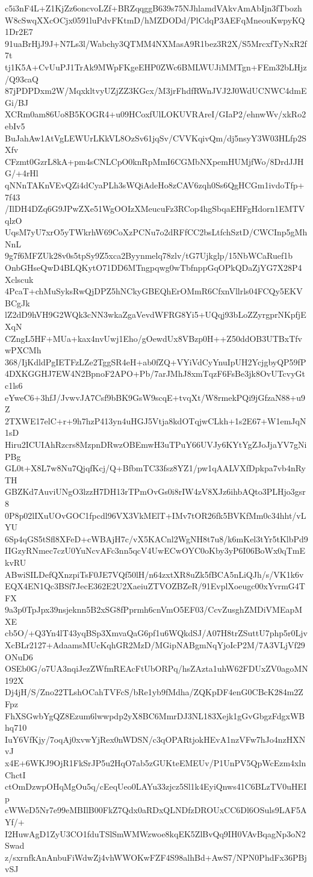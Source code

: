 c5i3nF4L+Z1KjZz6oncvoLZf+BRZqqggB639s75NJhlamdVAkvAmAbIjn3fTbozh
W8cSwqXXcOCjx0591luPdvFKtmD/hMZDODd/PlCdqP3AEFqMneouKwpyKQ1Dr2E7
91uaBrHjJ9J+N7Ls3l/Wabchy3QTMM4NXMasA9R1bez3R2X/S5MrcxfTyNxR2f7t
tj1K5A+CvUuPJ1TrAk9MWpFKgeEHP0ZWc6BMLWUJiMMTgn+FEm32bLHjz/Q93caQ
87jPDPDxm2W/MqxkltvyUZjZZ3KGcx/M3jrFhdfRWnJVJ2J0WdUCNWC4dmEGi/BJ
XCRm0am86Uo8B5KOGR4+u09HCoxfUlLOKUVRAreI/GIaP2/ehnwWv/xkRo2ebIv5
BuJahAw1AtVgLEWUrLKkVL8OzSv61jqSv/CVVKqivQm/dj5nsyY3W03HLfp2SXfv
CFzmt0GzrL8kA+pm4sCNLCpO0knRpMmI6CGMbNXpemHUMjfWo/8DrdJJHG/+4rHl
qNNnTAKnVEvQZi4dCyaPLh3sWQiAdeHo8zCAV6zqh0Ss6QgHCGm1ivdoTfp+7f43
/IlDH4DZq6G9JPwZXe51WgOOIzXMeucuFz3RCop4hgSbqaEHFgHdorn1EMTVqlzO
UqsM7yU7xrO5yTWkrhW69CoXzPCNu7o2dRFfCC2bsLtfchSztD/CWCInp5gMhNnL
9g7f6MFZUk28v0s5tpSy9Z5xca2Byynmelq78zlv/tG7Ujkglp/15NbWCaRuef1b
OnbGHseQwD4BLQKytO71DD6MTngpqwg0wTbfnppGqOPkQDaZjYG7X28P4Xclscuk
4PcaT+chMuSyksRwQjDPZ5hNCkyGBEQhErOMmR6CfxnVllrls04FCQy5EKVBCgJk
lZ2dD9hVH9G2WQk3cNN3wkaZgaVevdWFRG8Yi5+UQqj93bLoZZyrgprNKpfjEXqN
CZngL5HF+MUa+kax4nvUwj1Eho/gOewdUx8VBzp0H++Z50ddOB3UTBxTfvwPXCMh
368/IjKdldPgIETFzLZe2TggSR4eH+ab0fZQ+VYiVdCyYnuIpUH2YcjgbyQP59fP
4DXKGGHJ7EW4N2BpnoF2APO+Pb/7arJMhJ8xmTqzF6FsBe3jk8OvUTcvyGtc1ls6
eYweC6+3hfJ/JvwvJA7Csf9bBK9GsW9scqE+tvqXt/W8rmekPQi9jGfzaN88+u9Z
2TXWE17elC+r+9h7hzP413yn4uHGJ5Vtja8kdOTqjwCLkh+1s2E67+W1emJqN1sD
Hiru2ICUIAhRzcrs8MzpnDRwzOBEmwH3uTPuY66UVJy6KYtYgZJoJjaYV7gNiPBg
GL0t+X8L7w8Nu7QjqfKcj/Q+BfbmTC33fsz8YZ1/pw1qAALVXfDpkpa7vb4nRyTH
GBZKd7AuviUNgO3lzzH7DH13rTPmOvGs0i8rIW4zV8XJz6ihbAQto3PLHjo3gsr8
0P8p02lIXuUOvGOC1fpcdl96VX3VkMElT+IMv7tOR26fk5BVKfMm0c34hht/vLYU
6Sp4qGS5tSfl8XFeD+cWBAjH7c/vX5KACnl2WgNH8t7u8/k6mKel3tYr5tKlbPd9
IIGzyRNmec7czU0YuNcvAFc3nn5qcV4UwECwOYC0oKby3yP6I06BoWx0qTmEkvRU
ABwiSILDefQXnzpiTsF0JE7VQf50lH/n64zxtXR8uZk5fBCA5nLiQJh/s/VK1k6v
EQX4EN1Qc3BSf7JecE362E2U2XaeiuZTVOZBZeR/91EvplXoeugc00xYvrmG4TFX
9a3p0TpJpx39nsjeknn5B2xSG8fPprmh6cnVmO5EF03/CcvZusghZMDiVMEapMXE
cb5O/+Q3Yn4lT43yqBSp3XmvaQaG6pf1u6WQkdSJ/A07H8trZSuttU7php5r0Ljv
XcBLr2127+AdaamsMUcKqhGR2MzD/MGipNABgmNqYjoIcP2M/7A3VLjVf29ONuD6
OSEb0G/o7UA3nqiJezZWfmREAcFtUbORPq/hsZAzta1uhW62FDUxZV0agoMN192X
Dj4jH/S/Zno22TLshOCahTVFcS/bRe1yb9fMdha/ZQKpDF4enG0CBcK284m2ZFpz
FhXSGwbYgQZ8Ezum6lwwpdp2yX8BC6MmrDJ3NL183Xejk1gGvGbgzFdgxWBhq710
IuY6VfKjy/7oqAj0xvwYjRex0nWDSN/c3qOPARtjokHEvA1nzVFw7hJo4nzHXNvJ
x4E+6WKJ9OjR1FkSrJP5u2HqO7ab5zGUKteEMEUv/P1UnPV5QpWcEzm4xlnChctI
ctOmDzwpOHqMgOu5q/cEeqUeo0LAYu33zjcz5Sl1k4EyiQnws41C6BLzTV0uHEIp
cWWeD5Nr7e99eMBIlB00FkZ7Qdx0aRDxQLNDfzDROUxCC6Dl6OSuls9LAF5AYf/+
I2HuwAgD1ZyU3CO1fduTSlSmWMWzwoe8kqEK5ZlBvQq9IH0VAvBqagNp3oN2Swad
z/sxrnfkAnAnbuFiWdwZj4vhWWOKwFZF4S98alhBd+AwS7/NPN0PhdFx36PBjvSJ
